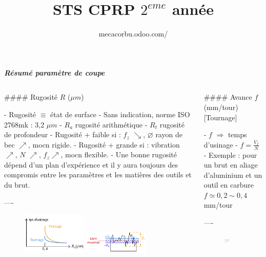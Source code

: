 \documentclass{beamer}
\author[Chevalier.V]{mecacorbu.odoo.com/}
\title{STS CPRP $2^{eme}$ année}
\institute{Lycée Le Corbusier}
\begin{document}
\begin{frame}[fragile]\centering

\textbf{\textit{Résumé paramètre de coupe}}

\begin{columns}
\begin{column}{0.57\textwidth}

\begin{markdown}

#### Rugosité $R$ ($\mu m$)

- Rugosité $\equiv$ état de surface
- Sans indication, norme ISO 2768mk : 3,2 $\mu m$
- $R_a$ rugosité arithmétique
- $R_t$ rugosité de profondeur
- Rugosité + faible si : $f_z$ $\searrow$, $\varnothing$ rayon de bec $\nearrow$, mocn rigide.
- Rugosité + grande si : vibration $\nearrow$, $N$ $\nearrow$, $f_z \nearrow$, mocn flexible.
- Une bonne rugosité dépend d'un plan d'expérience et il y aura toujours des compromis entre les paramètres et les matières des outils et du brut.


----
\end{markdown}
\begin{figure}
\includegraphics[width=0.4\textwidth]{courbe1.png}
\includegraphics[width=0.4\textwidth]{Ra1.png}
\end{figure}
\end{column}




\begin{column}{.4\textwidth}
\begin{markdown}




#### Avance $f$ (mm/tour) [Tournage]

- $f$ $\Rightarrow$ temps d'usinage
- $f=\frac{V_f}{N}$
- Exemple : pour un brut en aliage d'aluminium et un outil en carbure $f \simeq 0,2 \sim 0,4$ mm/tour

----
\end{markdown}
\begin{figure}
\includegraphics[width=0.3\textwidth]{f1.png}
\end{figure}


\end{column}
\end{columns}
\end{frame}
\end{document}
